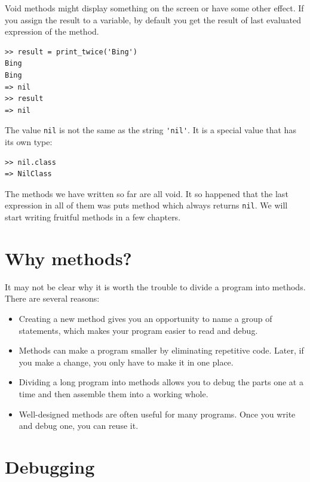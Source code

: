 \documentclass[10pt]{book}
\begin{document}
Void methods might display something on the screen or have some
other effect.  If you
assign the result to a variable, by default you get the
result of last evaluated expression of the method.

\begin{verbatim}
>> result = print_twice('Bing')
Bing
Bing
=> nil
>> result
=> nil
\end{verbatim}
%
The value {\tt nil} is not the same as the string \verb"'nil'". 
It is a special value that has its own type:

\begin{verbatim}
>> nil.class
=> NilClass
\end{verbatim}
%
The methods we have written so far are all void.  It so happened
that the last expression in all of them was puts method which
always returns {\tt nil}.  We will start
writing fruitful methods in a few chapters.


\section{Why methods?}

It may not be clear why it is worth the trouble to divide
a program into methods.  There are several reasons:

\begin{itemize}

\item Creating a new method gives you an opportunity to name a group
of statements, which makes your program easier to read and debug.

\item Methods can make a program smaller by eliminating repetitive
code.  Later, if you make a change, you only have
to make it in one place.

\item Dividing a long program into methods allows you to debug the
parts one at a time and then assemble them into a working whole.

\item Well-designed methods are often useful for many programs.
Once you write and debug one, you can reuse it.

\end{itemize}


\section{Debugging}
\end{document}
